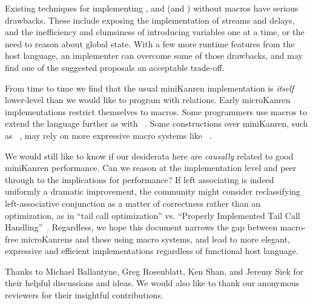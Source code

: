 \documentclass[sigplan,balance=true,pbalance=true,natbib=false]{acmart}
\begin{document}
Existing techniques for
implementing , 
and  (and ) without macros have
serious drawbacks. These include exposing the implementation of
streams and delays, and the inefficiency and clumsiness of introducing
variables one at a time, or the need to reason about global state. With
a few more runtime features from the host language, an implementer can
overcome some of those drawbacks, and may find one of the suggested
proposals an acceptable trade-off.

From time to time we find that the usual miniKanren implementation is
\emph{itself} lower-level than we would like to program with
relations. Early microKanren implementations restrict themselves
to  macros. Some programmers use macros to
extend the language further as
with ~\cite{keep2009pattern}. Some constructions
over miniKanren, such
as ~\cite{ballantyne2020macros}, may rely on
more expressive macro systems
like ~\cite{culpepper2012fortifying}.

We would still like to know if our desiderata here are \emph{causally}
related to good miniKanren performance. Can we reason at the
implementation level and peer through to the implications for
performance? If left associating  is indeed uniformly
a dramatic improvement, the community might consider reclassifying
left-associative conjunction as a matter of correctness rather than an
optimization, as in \enquote{tail call optimization} vs.
\enquote{Properly Implemented Tail Call
  Handling}~\cite{felleisen2014requestions}. Regardless, we hope this
document narrows the gap between macro-free microKanrens and those
using macro systems, and lead to more elegant, expressive and
efficient implementations regardless of functional host language.

\begin{acks}

  Thanks to Michael Ballantyne, Greg Rosenblatt, Ken Shan, and Jeremy
  Siek for their helpful discussions and ideas. We would also like to
  thank our anonymous reviewers for their insightful contributions.

\end{acks}

\printbibliography{}
\end{document}
